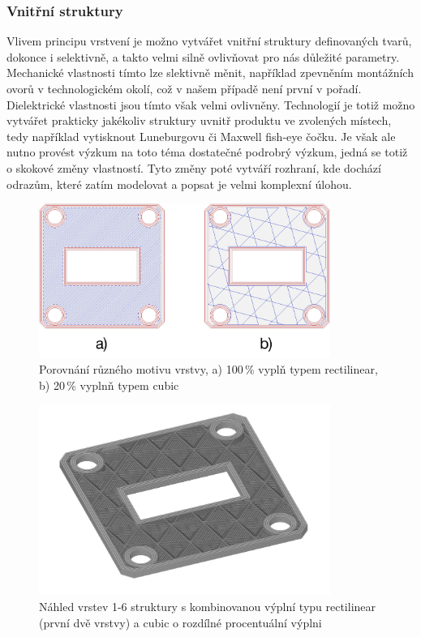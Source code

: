 \subsubsection{Vnitřní struktury}
Vlivem principu vrstvení je možno vytvářet vnitřní struktury definovaných tvarů, dokonce i selektivně, a takto velmi silně ovlivňovat pro nás důležité parametry.
Mechanické vlastnosti tímto lze slektivně měnit, například zpevněním montážních ovorů v technologickém okolí, což v našem případě není první v pořadí.
Dielektrické vlastnosti jsou tímto však velmi ovlivněny. Technologií je totiž možno vytvářet prakticky jakékoliv struktury uvnitř produktu ve zvolených místech, tedy například vytisknout Luneburgovu či Maxwell fish-eye čočku. Je však ale nutno provést výzkum na toto téma dostatečné podrobrý výzkum, jedná se totiž o skokové změny vlastností. Tyto změny poté vytváří rozhraní, kde dochází odrazům, které zatím modelovat a popsat je velmi komplexní úlohou.

\begin{figure}[h]
\begin{center}
\includegraphics[width=9.5cm]{pics/fillcompare}
\caption{Porovnání různého motivu vrstvy, a) 100\,\% vyplň typem rectilinear, b) 20\,\% vyplnň typem cubic}
\end{center}
\end{figure}

\begin{figure}[h]
\begin{center}
\includegraphics[width=9.5cm]{pics/6layer}
\caption{Náhled vrstev 1-6 struktury s kombinovanou výplní typu rectilinear (první dvě vrstvy) a cubic o rozdílné procentuální výplni}
\end{center}
\end{figure}

